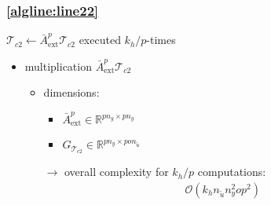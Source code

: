 \documentclass{article}
\begin{document}
\subsubsection{\cref{algline:line22}} 
$\mathcal{T}_{c2} \gets \bar{A}_\text{ext}^p \mathcal{T}_{c2}$
executed $k_h/p$-times
\begin{itemize}
    \item multiplication $\bar{A}_\text{ext}^{p} \mathcal{T}_{c2}$
    \begin{itemize}
        \item dimensions:
        \begin{itemize}
            \item $\bar{A}_\text{ext}^p \in \mathbb{R}^{pn_y \times pn_y}$
            \item $G_{\mathcal{T}_{c2}} \in \mathbb{R}^{pn_y \times p o n_{\tilde{u}}}$
        \end{itemize}
        \item[$\rightarrow$] overall complexity for $k_h/p$ computations:
        \begin{align*}
        \mathcal{O}(k_h n_{\tilde{u}} n_y^2 o p^2)
        \end{align*}
    \end{itemize}    
\end{itemize}
\end{document}
